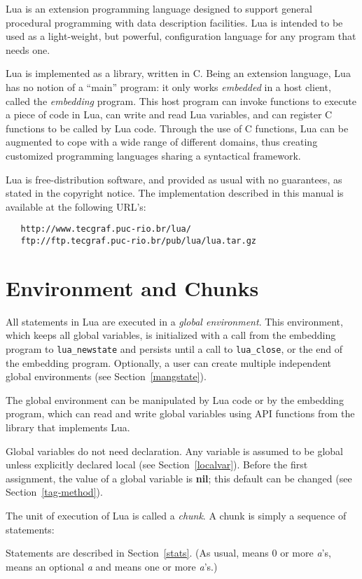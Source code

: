 \documentclass[11pt]{article}
\newcommand{\See}[1]{Section~\ref{#1}}
\newcommand{\see}[1]{(see \See{#1})}
\newcommand{\nil}{{\bf nil}}
\newcommand{\Index}[1]{#1\index{#1}}
\newcommand{\Def}[1]{\emph{#1}\index{#1}}
\begin{document}
Lua is an extension programming language designed to support
general procedural programming with data description
facilities.
Lua is intended to be used as a light-weight, but powerful,
configuration language for any program that needs one.

Lua is implemented as a library, written in C.
Being an extension language, Lua has no notion of a ``main'' program:
it only works \emph{embedded} in a host client,
called the \emph{embedding} program.
This host program can invoke functions to execute a piece of
code in Lua, can write and read Lua variables,
and can register C functions to be called by Lua code.
Through the use of C functions, Lua can be augmented to cope with
a wide range of different domains,
thus creating customized programming languages sharing a syntactical framework.

Lua is free-distribution software,
and provided as usual with no guarantees,
as stated in the copyright notice.
The implementation described in this manual is available
at the following URL's:
\begin{verbatim}
   http://www.tecgraf.puc-rio.br/lua/
   ftp://ftp.tecgraf.puc-rio.br/pub/lua/lua.tar.gz
\end{verbatim}


\section{Environment and Chunks}

All statements in Lua are executed in a \Def{global environment}.
This environment, which keeps all global variables,
is initialized with a call from the embedding program to
\verb|lua_newstate| and
persists until a call to \verb|lua_close|,
or the end of the embedding program.
Optionally, a user can create multiple independent global
environments \see{mangstate}.

The global environment can be manipulated by Lua code or
by the embedding program,
which can read and write global variables
using API functions from the library that implements Lua.

\Index{Global variables} do not need declaration.
Any variable is assumed to be global unless explicitly declared local
\see{localvar}.
Before the first assignment, the value of a global variable is \nil;
this default can be changed \see{tag-method}.

The unit of execution of Lua is called a \Def{chunk}.
A chunk is simply a sequence of statements:
\begin{Produc}
\end{Produc}%
Statements are described in \See{stats}.
(As usual,  means 0 or more \emph{a}'s,
 means an optional \emph{a} and  means
one or more \emph{a}'s.)
\end{document}
